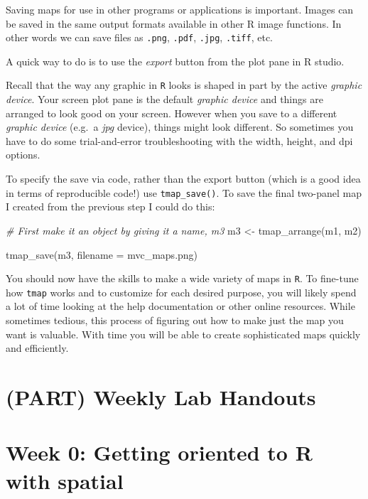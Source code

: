 \documentclass[
]{book}
\newenvironment{Shaded}{\begin{snugshade}}{\end{snugshade}}
\newcommand{\AttributeTok}[1]{\textcolor[rgb]{0.77,0.63,0.00}{#1}}
\newcommand{\CommentTok}[1]{\textcolor[rgb]{0.56,0.35,0.01}{\textit{#1}}}
\newcommand{\FunctionTok}[1]{\textcolor[rgb]{0.00,0.00,0.00}{#1}}
\newcommand{\NormalTok}[1]{#1}
\newcommand{\OtherTok}[1]{\textcolor[rgb]{0.56,0.35,0.01}{#1}}
\newcommand{\StringTok}[1]{\textcolor[rgb]{0.31,0.60,0.02}{#1}}
\begin{document}
Saving maps for use in other programs or applications is important. Images can be saved in the same output formats available in other R image functions. In other words we can save files as \texttt{.png}, \texttt{.pdf}, \texttt{.jpg}, \texttt{.tiff}, etc.

A quick way to do is to use the \emph{export} button from the plot pane in R studio.

Recall that the way any graphic in \texttt{R} looks is shaped in part by the active \emph{graphic device}. Your screen plot pane is the default \emph{graphic device} and things are arranged to look good on your screen. However when you save to a different \emph{graphic device} (e.g.~a \emph{jpg} device), things might look different. So sometimes you have to do some trial-and-error troubleshooting with the width, height, and dpi options.

To specify the save via code, rather than the export button (which is a good idea in terms of reproducible code!) use \texttt{tmap\_save()}. To save the final two-panel map I created from the previous step I could do this:

\begin{Shaded}
\begin{Highlighting}[]
\CommentTok{\# First make it an object by giving it a name, m3}
\NormalTok{m3 }\OtherTok{\textless{}{-}} \FunctionTok{tmap\_arrange}\NormalTok{(m1, m2)}

\FunctionTok{tmap\_save}\NormalTok{(m3, }\AttributeTok{filename =} \StringTok{\textquotesingle{}mvc\_maps.png\textquotesingle{}}\NormalTok{)}
\end{Highlighting}
\end{Shaded}

You should now have the skills to make a wide variety of maps in \texttt{R}. To fine-tune how \texttt{tmap} works and to customize for each desired purpose, you will likely spend a lot of time looking at the help documentation or other online resources. While sometimes tedious, this process of figuring out how to make just the map you want is valuable. With time you will be able to create sophisticated maps quickly and efficiently.

\hypertarget{part-weekly-lab-handouts}{%
\chapter{(PART) Weekly Lab Handouts}\label{part-weekly-lab-handouts}}

\hypertarget{week-0-getting-oriented-to-r-with-spatial}{%
\chapter{Week 0: Getting oriented to R with spatial}\label{week-0-getting-oriented-to-r-with-spatial}}
\end{document}
